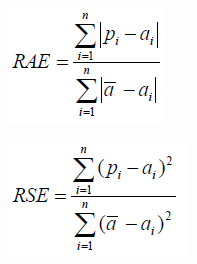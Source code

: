 \documentclass[a4paper,12pt, english]{article}
\begin{document}
\begin{enumerate}
\begin{enumerate}
\begin{figure}[h]
         ~ %
        \begin{subfigure}[b]{0.23\textwidth}
                \includegraphics[width=\textwidth]{../figs/RAE}
                \label{fig:rae}
        \end{subfigure}\quad
        \begin{subfigure}[b]{0.23\textwidth}
                \includegraphics[width=\textwidth]{../figs/RSE}
                \label{fig:rse}
        \end{subfigure}
        

\end{figure}
\end{enumerate}
\end{enumerate}
\end{document}
